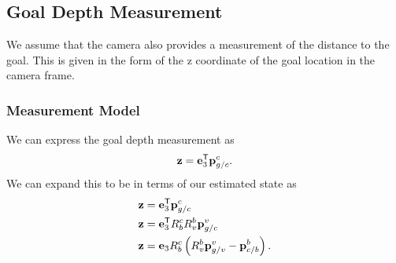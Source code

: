 


\subsection{Goal Depth Measurement}
We assume that the camera also provides a measurement of the distance to the
goal. This is given in the form of the z coordinate of the goal location in the
camera frame.

\subsubsection{Measurement Model}
We can express the goal depth measurement as
\begin{equation}
  \boldsymbol{\mathrm{z}} = \boldsymbol{\mathrm{e}}_3^{\mathsf{T}} \boldsymbol{\mathrm{p}}_{g/c}^c.
\end{equation}
We can expand this to be in terms of our estimated state as
\begin{align}
  \boldsymbol{\mathrm{z}} &= \boldsymbol{\mathrm{e}}_3^{\mathsf{T}} \boldsymbol{\mathrm{p}}_{g/c}^c \\
  \boldsymbol{\mathrm{z}} &= \boldsymbol{\mathrm{e}}_3^{\mathsf{T}} R_b^c R_v^b \boldsymbol{\mathrm{p}}_{g/c}^v \\
  \boldsymbol{\mathrm{z}} &= \boldsymbol{\mathrm{e}}_3 R_b^c \left(R_v^b \boldsymbol{\mathrm{p}}_{g/v}^v -
    \boldsymbol{\mathrm{p}}_{c/b}^b\right).
\end{align}

